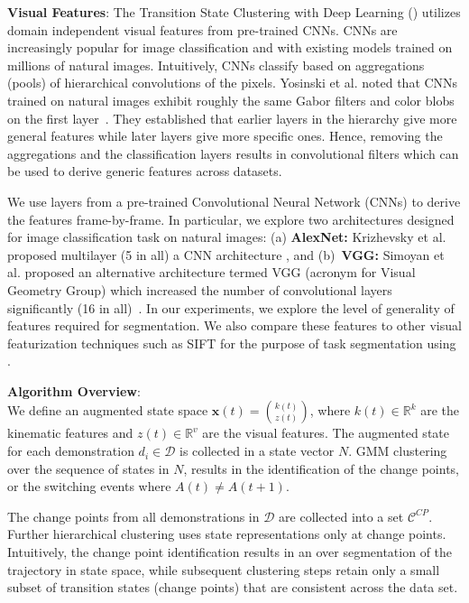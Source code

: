 \documentclass[0-main.tex]{subfiles}
\begin{document}
\vspace{2pt}
\noindent\textbf{Visual Features}:
The Transition State Clustering with Deep Learning (\TSC) utilizes 
domain independent visual features from pre-trained CNNs. 
CNNs are increasingly popular for image classification and with existing models trained on millions of natural images.
Intuitively, CNNs classify based on aggregations (pools) of hierarchical convolutions of the pixels. Yosinski et al. noted that CNNs trained on natural images exhibit roughly the same Gabor filters and color blobs on the first layer~\cite{yosinski2014NIPS}. They established that earlier layers in the hierarchy give more general features while later layers give more specific ones. Hence, removing the aggregations and the classification layers results in convolutional filters which can be used to derive generic features across datasets.

We use layers from a pre-trained Convolutional Neural Network (CNNs) to derive the features frame-by-frame. In particular, we explore two architectures designed for image classification task on natural images: (a) \textbf{AlexNet: } Krizhevsky et al. proposed multilayer (5 in all) a CNN architecture \cite{krizhevsky2012imagenet}, and (b)~\textbf{VGG: } Simoyan et al. proposed an alternative architecture termed VGG (acronym for Visual Geometry Group) which increased the number of convolutional layers significantly (16 in all)~\cite{simonyan2014very}. In our experiments, we explore the level of generality of features required for segmentation. We also compare these features to other visual featurization techniques such as SIFT for the purpose of task segmentation using \TSC.


\vspace{2pt}
\noindent\textbf{Algorithm Overview}: \\
We define an augmented state space $\mathbf{x}(t) = \binom{k(t)}{z(t)}$, where $k(t) \in \mathbb{R}^k$ are the kinematic features and $z(t) \in \mathbb{R}^v$ are the visual features.
The augmented state for each demonstration $d_i \in \mathcal{D}$ is collected in a state vector $N$. GMM clustering over the sequence of states in $N$, results in the identification of the change points, or the switching events where $A(t) \ne A(t+1)$.

The change points from all demonstrations in  $\mathcal{D}$ are collected into a set $\mathcal{C}^{CP}$. Further hierarchical clustering uses state representations only at change points. 
Intuitively, the change point identification results in an over segmentation of the trajectory in state space, while subsequent clustering steps retain only a small subset of transition states (change points) that are consistent across the data set. 
\end{document}
